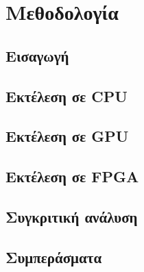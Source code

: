 \chapter{Μεθοδολογία}
\label{ch:method} %

\section{Εισαγωγή}
\label{sec:intro} %

\section{Εκτέλεση σε CPU}
\section{Εκτέλεση σε GPU}
\section{Εκτέλεση σε FPGA}
\section{Συγκριτική ανάλυση}
\section{Συμπεράσματα}